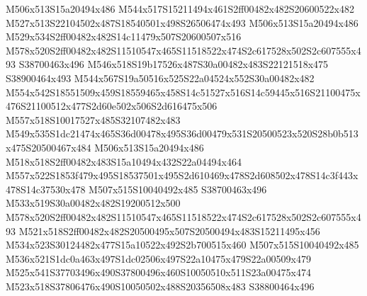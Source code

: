 \documentclass{article}
\begin{document}
\begin{multicols}{2}
M506x513S15a20494x486 M544x517S15211494x461S2ff00482x482S20600522x482 M527x513S22104502x487S18540501x498S26506474x493 M506x513S15a20494x486 M529x534S2ff00482x482S14c11479x507S20600507x516 M578x520S2ff00482x482S11510547x465S11518522x474S2c617528x502S2c607555x493 S38700463x496 M546x518S19b17526x487S30a00482x483S22121518x475 S38900464x493 M544x567S19a50516x525S22a04524x552S30a00482x482 M554x542S18551509x459S18559465x458S14c51527x516S14c59445x516S21100475x476S21100512x477S2d60e502x506S2d616475x506 M557x518S10017527x485S32107482x483 M549x535S1dc21474x465S36d00478x495S36d00479x531S20500523x520S28b0b513x475S20500467x484 M506x513S15a20494x486 M518x518S2ff00482x483S15a10494x432S22a04494x464 M557x522S1853f479x495S18537501x495S2d610469x478S2d608502x478S14c3f443x478S14c37530x478 M507x515S10040492x485 S38700463x496 M533x519S30a00482x482S19200512x500 M578x520S2ff00482x482S11510547x465S11518522x474S2c617528x502S2c607555x493 M521x518S2ff00482x482S20500495x507S20500494x483S15211495x456 M534x523S30124482x477S15a10522x492S2b700515x460 M507x515S10040492x485 M536x521S1dc0a463x497S1dc02506x497S22a10475x479S22a00509x479 M525x541S37703496x490S37800496x460S10050510x511S23a00475x474 M523x518S37806476x490S10050502x488S20356508x483 S38800464x496











\end{multicols}
\end{document}
